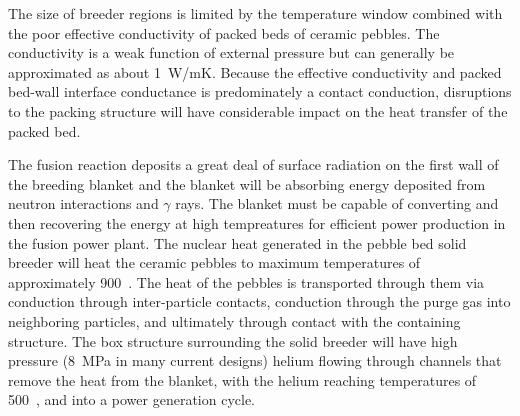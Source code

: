 The size of breeder regions is limited by the temperature window combined with the poor effective conductivity of packed beds of ceramic pebbles. The conductivity is a weak function of external pressure but can generally be approximated as about \si{1 W/{mK}}. Because the effective conductivity and packed bed-wall interface conductance is predominately a contact conduction, disruptions to the packing structure will have considerable impact on the heat transfer of the packed bed.

The fusion reaction deposits a great deal of surface radiation on the first wall of the breeding blanket and the blanket will be absorbing energy deposited from neutron interactions and $\gamma$ rays. The blanket must be capable of converting and then recovering the energy at high tempreatures for efficient power production in the fusion power plant. The nuclear heat generated in the pebble bed solid breeder will heat the ceramic pebbles to maximum temperatures of approximately 900~\celsius. The heat of the pebbles is transported through them via conduction through inter-particle contacts, conduction through the purge gas into neighboring particles, and ultimately through contact with the containing structure. The box structure surrounding the solid breeder will have high pressure (\si{8~MPa} in many current designs) helium flowing through channels that remove the heat from the blanket, with the helium reaching temperatures of 500~\celsius, and into a power generation cycle.
